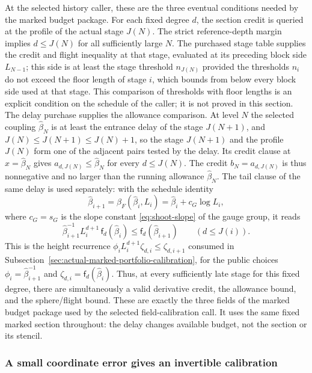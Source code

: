 At the selected history caller, these are the three eventual conditions
needed by the marked budget package. For each fixed degree $d$, the section
credit is queried at the profile of the actual stage $J(N)$. The strict
reference-depth margin implies $d\leq J(N)$ for all sufficiently large
$N$. The purchased stage table supplies the credit and flight inequality
at that stage, evaluated at its preceding block side $L_{N-1}$; this side
is at least the stage threshold $n_{J(N)}$ provided the thresholds $n_i$
do not exceed the floor length of stage $i$, which bounds from below
every block side used at that stage. This comparison of thresholds with
floor lengths is an explicit condition on the schedule of the caller; it
is not proved in this section. The
delay purchase supplies the allowance comparison. At level $N$ the
selected coupling $\widehat\beta_N$ is at least the entrance delay of the
stage $J(N+1)$, and $J(N)\leq J(N+1)\leq J(N)+1$, so the stage $J(N+1)$
and the profile $J(N)$ form one of the adjacent pairs tested by the delay.
Its credit clause at $x=\widehat\beta_N$ gives
$a_{d,J(N)}\leq\widehat\beta_N$ for every $d\leq J(N)$. The credit
$b_N=a_{d,J(N)}$ is thus nonnegative and no larger than the running
allowance $\widehat\beta_N$. The tail clause of the same delay is used
separately: with the schedule identity
\[
 \widehat\beta_{i+1}=\beta_F(\widehat\beta_i,L_i)
       =\widehat\beta_i+c_G\log L_i,
\]
where $c_G=s_G$ is the slope constant \eqref{eq:shoot-slope} of the
gauge group, it reads
\begin{equation}\label{eq:ex-marked-height-jump}
 \widehat\beta_{i+1}^{-1}L_i^{d+1}\,\mathsf f_d(\widehat\beta_i)
      \leq\mathsf f_d(\widehat\beta_{i+1})\qquad(d\leq J(i)).
\end{equation}
This is the height recurrence
$\phi_iL_i^{d+1}\zeta_{d,i}\leq\zeta_{d,i+1}$ consumed in
Subsection~\ref{sec:actual-marked-portfolio-calibration}, for the public
choices $\phi_i=\widehat\beta_{i+1}^{-1}$ and
$\zeta_{d,i}=\mathsf f_d(\widehat\beta_i)$.
Thus, at every sufficiently late stage for this fixed degree,
there are simultaneously a valid derivative credit, the allowance bound,
and the sphere/flight bound. These are exactly the three fields of the
marked budget package used by the selected field-calibration call. It uses
the same fixed marked section throughout: the delay changes available budget,
not the section or its stencil.

\subsubsection{A small coordinate error gives an invertible calibration}

